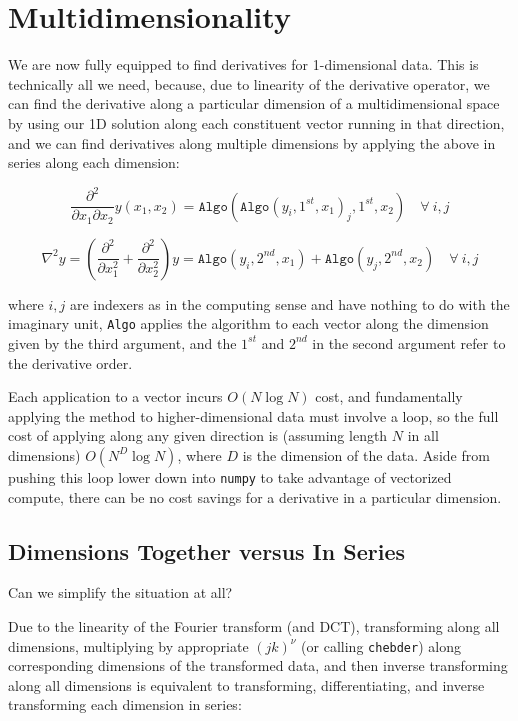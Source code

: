 \documentclass[10pt]{article}
\begin{document}
\section{Multidimensionality}

We are now fully equipped to find derivatives for 1-dimensional data. This is technically all we need, because, due to linearity of the derivative operator, we can find the derivative along a particular dimension of a multidimensional space by using our 1D solution along each constituent vector running in that direction, and we can find derivatives along multiple dimensions by applying the above in series along each dimension:

$$\frac{\partial^2}{\partial x_1 \partial x_2} y(x_1, x_2) = \texttt{Algo}(\texttt{Algo}(y_i, 1^{st}, x_1)_j, 1^{st}, x_2) \quad \forall\ i, j$$

$$ \nabla^2 y = (\frac{\partial^2}{\partial x_1^2} + \frac{\partial^2}{\partial x_2^2}) y = \texttt{Algo}(y_i, 2^{nd}, x_1) + \texttt{Algo}(y_j, 2^{nd}, x_2) \quad \forall\ i, j$$

where $i, j$ are indexers as in the computing sense and have nothing to do with the imaginary unit, \texttt{Algo} applies the algorithm to each vector along the dimension given by the third argument, and the $1^{st}$ and $2^{nd}$ in the second argument refer to the derivative order.

Each application to a vector incurs $O(N \log N)$ cost, and fundamentally applying the method to higher-dimensional data must involve a loop, so the full cost of applying along any given direction is (assuming length $N$ in all dimensions) $O(N^D \log N)$, where $D$ is the dimension of the data. Aside from pushing this loop lower down into \texttt{numpy} to take advantage of vectorized compute, there can be no cost savings for a derivative in a particular dimension.

\subsection{Dimensions Together versus In Series}

Can we simplify the situation at all?

Due to the linearity of the Fourier transform (and DCT), transforming along all dimensions, multiplying by appropriate $(jk)^\nu$ (or calling \texttt{chebder}) along corresponding dimensions of the transformed data, and then inverse transforming along all dimensions is equivalent to transforming, differentiating, and inverse transforming each dimension in series\cite{johnson}:
\end{document}
